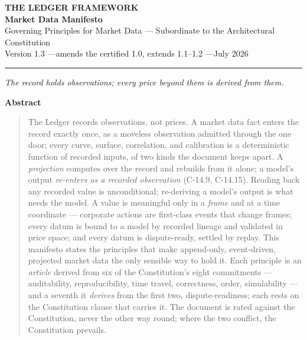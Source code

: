 \documentclass[11pt,a4paper]{article}
\begin{document}
\begin{center}
  {\LARGE\bfseries THE LEDGER FRAMEWORK}\\[0.9em]
  {\large\bfseries Market Data Manifesto}\\[0.6em]
  {\normalsize Governing Principles for Market Data ---
   Subordinate to the Architectural Constitution}\\[1.4em]
  Version 1.3 \quad---\quad amends the certified 1.0, extends 1.1--1.2 \quad---\quad July 2026
\end{center}

\vspace{0.6em}
\begin{center}\rule{0.35\linewidth}{0.4pt}\end{center}
\vspace{0.6em}

\begin{center}\itshape
The record holds observations; every price beyond them is derived from them.
\end{center}

\vspace{0.4em}

\begin{center}\textbf{Abstract}\end{center}
\begin{quote}
The Ledger records observations, not prices. A market data fact enters
the record exactly once, as a moveless observation admitted through the
one door; every curve, surface, correlation, and calibration is a
deterministic function of recorded inputs, of two kinds the document
keeps apart. A \emph{projection} computes over the record and rebuilds
from it alone; a model's output \emph{re-enters as a recorded
observation} (C-14.9, C-14.15). Reading back any recorded value is
unconditional; re-deriving a model's output is what needs the model. A
value is meaningful only in a \emph{frame} and at a time coordinate ---
corporate actions are first-class events that change frames; every datum
is bound to a model by recorded lineage and validated in price space;
and every datum is dispute-ready, settled by replay. This manifesto
states the principles that make append-only, event-driven, projected
market data the only sensible way to hold it. Each principle is an
\emph{article} derived from six of the Constitution's eight commitments
--- auditability, reproducibility, time travel, correctness, order,
simulability --- and a seventh it \emph{derives} from the first two,
dispute-readiness; each rests on the Constitution clause that carries it.
The document is rated against the Constitution, never the other way round;
where the two conflict, the Constitution prevails.
\end{quote}
\end{document}
